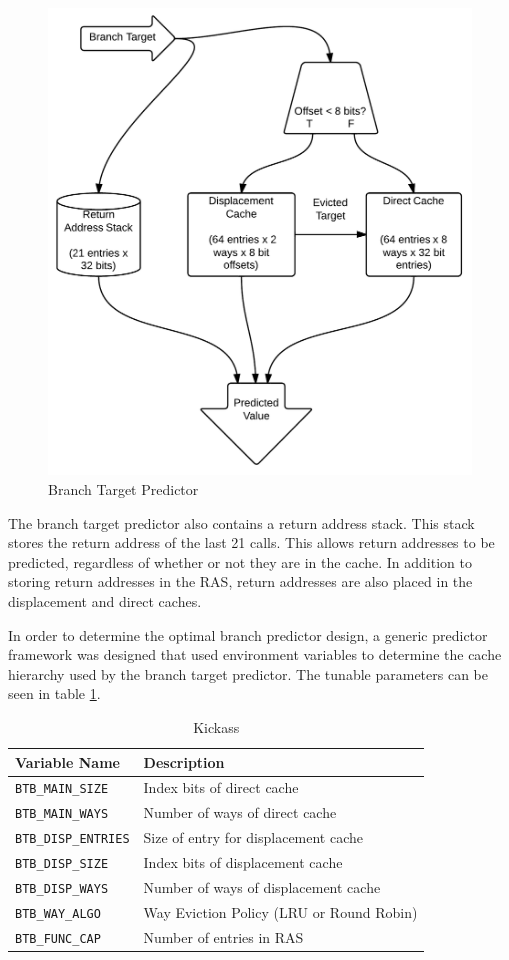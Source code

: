 \documentclass[twocolumn]{article}
\newcommand{\centerimage}[3]{
\begin{figure}[ht!]  
\begin{center}
#1
\caption{#2}
\label{#3}
\end{center}
\end{figure}}
\begin{document}
\centerimage{\includegraphics[width=\columnwidth]{BTB.png}}{Branch
  Target Predictor}{btbshape}

The branch target predictor also contains a return address stack. This
stack stores the return address of the last 21 calls. This allows
return addresses to be predicted, regardless of whether or not they
are in the cache. In addition to storing return addresses in the RAS,
return addresses are also placed in the displacement and direct
caches. 

In order to determine the optimal branch predictor design, a generic
predictor framework was designed that used environment variables to
determine the cache hierarchy used by the branch target predictor.
The tunable parameters can be seen in table \ref{envars}. 


\begin{table}
\begin{center}\begin{tabular}{p{}p{}}
Variable Name & Description \\
\hline
\texttt{BTB\_MAIN\_SIZE} & Index bits of direct cache \\
\texttt{BTB\_MAIN\_WAYS} & Number of ways of direct cache \\
\texttt{BTB\_DISP\_ENTRIES} & Size of entry for displacement cache \\
\texttt{BTB\_DISP\_SIZE} & Index bits of displacement cache \\
\texttt{BTB\_DISP\_WAYS} & Number of ways of displacement cache \\
\texttt{BTB\_WAY\_ALGO} & Way Eviction Policy (LRU or Round Robin) \\
\texttt{BTB\_FUNC\_CAP} & Number of entries in RAS 
\end{tabular}\end{center}
\caption{Kickass}
\label{envars}
\end{table}
\end{document}
